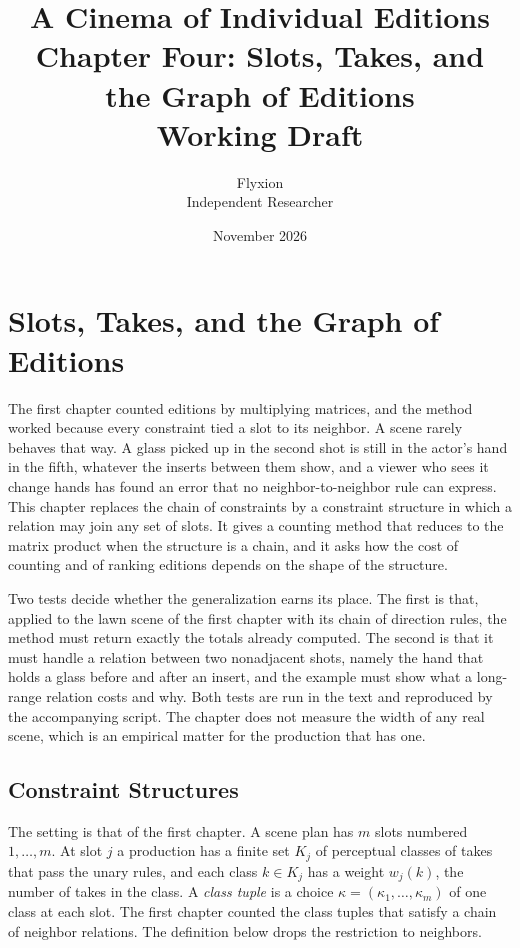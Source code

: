 \documentclass[11pt,twoside,openright]{book}
\title{\Huge\bfseries A Cinema of Individual Editions\\[1.2ex]
\large Chapter Four: Slots, Takes, and the Graph of Editions\\[0.4ex]
\large Working Draft}
\author{Flyxion\\[0.3ex]\small Independent Researcher}
\date{November 2026}
\theoremstyle{plain}
\theoremstyle{definition}
\theoremstyle{remark}
\begin{document}
\frontmatter
\maketitle
\tableofcontents
\mainmatter
\setcounter{chapter}{3}

\chapter{Slots, Takes, and the Graph of Editions}
\label{ch:graph}

The first chapter counted editions by multiplying matrices, and the method worked because every constraint tied a slot to its neighbor. A scene rarely behaves that way. A glass picked up in the second shot is still in the actor's hand in the fifth, whatever the inserts between them show, and a viewer who sees it change hands has found an error that no neighbor-to-neighbor rule can express. This chapter replaces the chain of constraints by a constraint structure in which a relation may join any set of slots. It gives a counting method that reduces to the matrix product when the structure is a chain, and it asks how the cost of counting and of ranking editions depends on the shape of the structure.

Two tests decide whether the generalization earns its place. The first is that, applied to the lawn scene of the first chapter with its chain of direction rules, the method must return exactly the totals already computed. The second is that it must handle a relation between two nonadjacent shots, namely the hand that holds a glass before and after an insert, and the example must show what a long-range relation costs and why. Both tests are run in the text and reproduced by the accompanying script. The chapter does not measure the width of any real scene, which is an empirical matter for the production that has one.

\section{Constraint Structures}\label{sec:structures}

The setting is that of the first chapter. A scene plan has $m$ slots numbered $1,\dots,m$. At slot $j$ a production has a finite set $K_j$ of perceptual classes of takes that pass the unary rules, and each class $k\in K_j$ has a weight $w_j(k)$, the number of takes in the class. A \emph{class tuple} is a choice $\kappa=(\kappa_1,\dots,\kappa_m)$ of one class at each slot. The first chapter counted the class tuples that satisfy a chain of neighbor relations. The definition below drops the restriction to neighbors.
\end{document}

